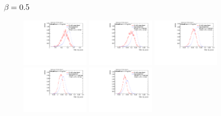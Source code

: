 \subsubsection*{$\beta=0.5$}
\vspace{-0.5cm}
\begin{figure}[H]
\includegraphics[width=0.3\textwidth]{sascha_input/Appendix/Distributions/w/distributions/beta05/h_assisted_tj_C2_05_bin1.pdf} \hspace{1mm}
\includegraphics[width=0.3\textwidth]{sascha_input/Appendix/Distributions/w/distributions/beta05/h_assisted_tj_C2_05_bin2.pdf} \hspace{1mm}
\includegraphics[width=0.3\textwidth]{sascha_input/Appendix/Distributions/w/distributions/beta05/h_assisted_tj_C2_05_bin3.pdf} 
\bigskip
\includegraphics[width=0.3\textwidth]{sascha_input/Appendix/Distributions/w/distributions/beta05/h_assisted_tj_C2_05_bin4.pdf} \hspace{1mm}
\includegraphics[width=0.3\textwidth]{sascha_input/Appendix/Distributions/w/distributions/beta05/h_assisted_tj_C2_05_bin5.pdf} \hspace{1mm}

\end{figure}
